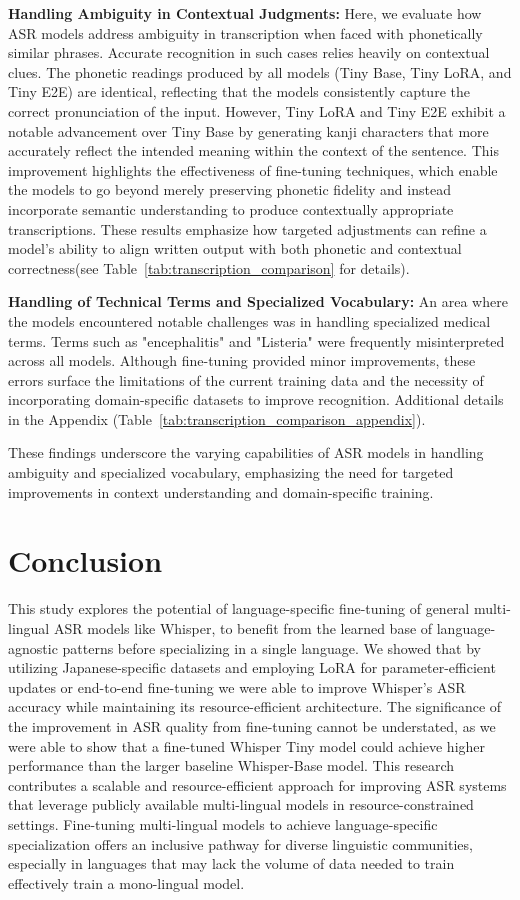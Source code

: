 \documentclass[10pt,twocolumn,letterpaper]{article}
\begin{document}
\textbf{Handling Ambiguity in Contextual Judgments:}
Here, we evaluate how ASR models address ambiguity in transcription when faced with phonetically similar phrases. Accurate recognition in such cases relies heavily on contextual clues. The phonetic readings produced by all models (Tiny Base, Tiny LoRA, and Tiny E2E) are identical, reflecting that the models consistently capture the correct pronunciation of the input. However, Tiny LoRA and Tiny E2E exhibit a notable advancement over Tiny Base by generating kanji characters that more accurately reflect the intended meaning within the context of the sentence. This improvement highlights the effectiveness of fine-tuning techniques, which enable the models to go beyond merely preserving phonetic fidelity and instead incorporate semantic understanding to produce contextually appropriate transcriptions. These results emphasize how targeted adjustments can refine a model's ability to align written output with both phonetic and contextual correctness(see Table~\ref{tab:transcription_comparison} for details).

\textbf{Handling of Technical Terms and Specialized Vocabulary:}
An area where the models encountered notable challenges was in handling specialized medical terms. Terms such as "encephalitis" and "Listeria" were frequently misinterpreted across all models. Although fine-tuning provided minor improvements, these errors surface the limitations of the current training data and the necessity of incorporating domain-specific datasets to improve recognition. Additional details in the Appendix (Table~\ref{tab:transcription_comparison_appendix}).

These findings underscore the varying capabilities of ASR models in handling ambiguity and specialized vocabulary, emphasizing the need for targeted improvements in context understanding and domain-specific training. 

\section{Conclusion}
This study explores the potential of language-specific fine-tuning of general multi-lingual ASR models like Whisper, to benefit from the learned base of language-agnostic patterns before specializing in a single language. 
We showed that by utilizing Japanese-specific datasets and employing LoRA for parameter-efficient updates or end-to-end fine-tuning we were able to improve Whisper's ASR accuracy while maintaining its resource-efficient architecture. 
The significance of the improvement in ASR quality from fine-tuning cannot be understated, as we were able to show that a fine-tuned Whisper Tiny model could achieve higher performance than the larger baseline Whisper-Base model. This research contributes a scalable and resource-efficient approach for improving ASR systems that leverage publicly available multi-lingual models in resource-constrained settings.
Fine-tuning multi-lingual models to achieve language-specific specialization offers an inclusive pathway for diverse linguistic communities, especially in languages that may lack the volume of data needed to train effectively train a mono-lingual model.
\end{document}
